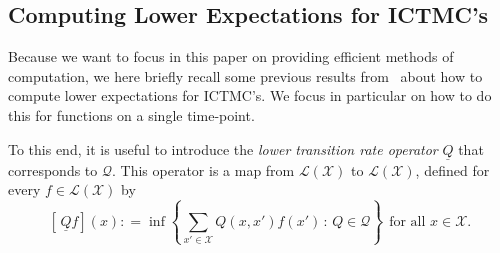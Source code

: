 \documentclass[twoside,11pt]{article}
\newcommand{\states}{\mathcal{X}}
\newcommand{\gambles}{\mathcal{L}}
\newcommand{\gamblesX}{\gambles(\states)}
\newcommand{\rateset}{\mathcal{Q}}
\newcommand{\lrate}{\underline{Q}}
\newcommand{\coloneqq}{:\!=}
\begin{document}
\subsection{Computing Lower Expectations for ICTMC's}\label{subsec:ICTMC_computations}

Because we want to focus in this paper on providing efficient methods of computation, we here briefly recall some previous results from~\citet{krak2016ictmc} about how to compute lower expectations for ICTMC's. We focus in particular on how to do this for functions on a single time-point. 

To this end, it is useful to introduce the \emph{lower transition rate operator} $\lrate$ that corresponds to $\rateset$. This operator is a map from $\gamblesX$ to $\gamblesX$, defined for every $f\in\gamblesX$ by
\begin{equation}\label{eq:lower_rate_is_inf}
\left[\,\lrate f\right](x) \coloneqq \inf\left\{ \sum_{x'\in\states}Q(x,x')f(x')\,:\, Q\in\rateset \right\}
~~\text{for all $x\in\states$}.
\end{equation}
\end{document}
